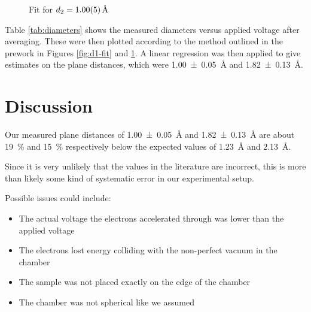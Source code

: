\documentclass[a4paper]{scrartcl}
\begin{document}
\begin{figure}
    \centering
    \caption{Fit for \(d_2 = \SI{1.00 \pm 0.05}{\angstrom}\)}
    \label{fig:d2-fit}
\end{figure}

Table \ref{tab:diameters} shows the measured diameters versus applied voltage after averaging. These were then plotted according to the method outlined in the prework in Figures \ref{fig:d1-fit} and \ref{fig:d2-fit}. A linear regression \cite{linear-regression} was then applied to give estimates on the plane distances, which were \SI{1.00 \pm 0.05}{\angstrom} and \SI{1.82 \pm 0.13}{\angstrom}.

\section{Discussion}
Our measured plane distances of \SI{1.00 \pm 0.05}{\angstrom} and \SI{1.82 \pm 0.13}{\angstrom} are about \SI{19}{\percent} and \SI{15}{\percent} respectively below the expected values of \SI{1.23}{\angstrom} and \SI{2.13}{\angstrom}.

Since it is very unlikely that the values in the literature are incorrect, this is more than likely some kind of systematic error in our experimental setup.

Possible issues could include:
\begin{itemize}
	\item The actual voltage the electrons accelerated through was lower than the applied voltage
	\item The electrons lost energy colliding with the non-perfect vacuum in the chamber
	\item The sample was not placed exactly on the edge of the chamber
	\item The chamber was not spherical like we assumed
\end{itemize}
\end{document}
